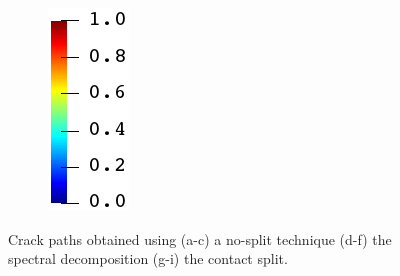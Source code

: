 \begin{figure}[htb!]
\begin{subfigure}[b]{0.065\textwidth}
    \includegraphics[width=\textwidth]{Chapter4/figures/jet_vertical.png}
    \vspace{0.15in}
  \end{subfigure}
  \caption{Crack paths obtained using (a-c) a no-split technique (d-f) the spectral decomposition (g-i) the contact split. }
  \label{fig: Chapter4/biaxial_crack_path}
\end{figure}
